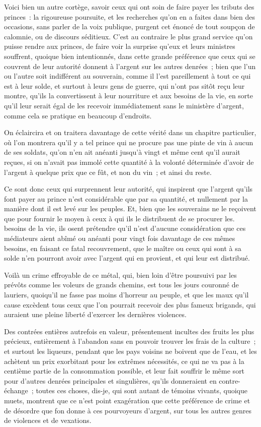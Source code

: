 \documentclass[french,twoside]{book} %
\begin{document}
Voici bien un autre cortège, savoir ceux qui ont soin de faire payer les tributs des princes : la rigoureuse poursuite, et les recherches qu’on en a faites dans bien des occasions, sans parler de la voix publique, purgent cet énoncé de tout soupçon de calomnie, ou de discours séditieux. C’est au contraire le plus grand service qu’on puisse rendre aux princes, de faire voir la surprise qu’eux et leurs ministres souffrent, quoique bien intentionnés, dans cette grande préférence que ceux qui se couvrent de leur autorité donnent à l’argent sur les autres denrées ; bien que l’un ou l’autre soit indifférent au souverain, comme il l’est pareillement à tout ce qui est à leur solde, et surtout à leurs gens de guerre, qui n’ont pas sitôt reçu leur montre, qu’ils la convertissent à leur nourriture et aux besoins de la vie, en sorte qu’il leur serait égal de les recevoir immédiatement sans le ministère d’argent, comme cela se pratique en beaucoup d’endroits.\par
On éclaircira et on traitera davantage de cette vérité dans un chapitre particulier, où l’on montrera qu’il y a tel prince qui ne procure pas une pinte de vin à aucun de ses soldats, qu’on n’en ait anéanti jusqu’à vingt et même cent qu’il aurait reçues, si on n’avait pas immolé cette quantité à la volonté déterminée d’avoir de l’argent à quelque prix que ce fût, et non du vin ; et ainsi du reste.\par
Ce sont donc ceux qui surprennent leur autorité, qui inspirent que l’argent qu’ils font payer au prince n’est considérable que par sa quantité, et nullement par la manière dont il est levé sur les peuples. Et, bien que les souverains ne le reçoivent que pour fournir le moyen à ceux à qui ils le distribuent de se procurer les. besoins de la vie, ils osent prétendre qu’il n’est d’aucune considération que ces médiateurs aient abîmé ou anéanti pour vingt fois davantage de ces mêmes besoins, en faisant ce fatal recouvrement, que le maître ou ceux qui sont à sa solde n’en pourront avoir avec l’argent qui en provient, et qui leur est distribué.\par
Voilà un crime effroyable de ce métal, qui, bien loin d’être poursuivi par les prévôts comme les voleurs de grands chemins, est tous les jours couronné de lauriers, quoiqu’il ne fasse pas moins d’horreur au peuple, et que les maux qu’il cause excèdent tous ceux que l’on pourrait recevoir des plus fameux brigands, qui auraient une pleine liberté d’exercer les dernières violences.\par
Des contrées entières autrefois en valeur, présentement incultes des fruits les plus précieux, entièrement à l’abandon sans en pouvoir trouver les frais de la culture ; et surtout les liqueurs, pendant que les pays voisins ne boivent que de l’eau, et les achètent un prix exorbitant pour les extrêmes nécessités, ce qui ne va pas à la centième partie de la consommation possible, et leur fait souffrir le même sort pour d’autres denrées principales et singulières, qu’ils donneraient en contre-échange ; toutes ces choses, dis-je, qui sont autant de témoins vivants, quoique muets, montrent que ce n’est point exagération que cette préférence de crime et de désordre que fon donne à ces pourvoyeurs d’argent, sur tous les autres genres de violences et de vexations.\par
\end{document}
